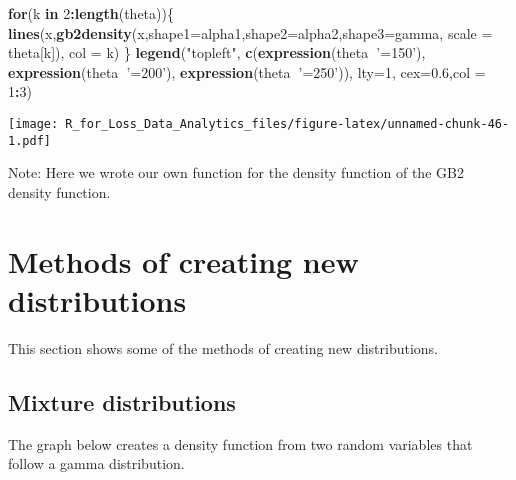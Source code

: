 \documentclass[]{book}
\newenvironment{Shaded}{\begin{snugshade}}{\end{snugshade}}
\newcommand{\KeywordTok}[1]{\textcolor[rgb]{0.13,0.29,0.53}{\textbf{#1}}}
\newcommand{\DataTypeTok}[1]{\textcolor[rgb]{0.13,0.29,0.53}{#1}}
\newcommand{\DecValTok}[1]{\textcolor[rgb]{0.00,0.00,0.81}{#1}}
\newcommand{\FloatTok}[1]{\textcolor[rgb]{0.00,0.00,0.81}{#1}}
\newcommand{\StringTok}[1]{\textcolor[rgb]{0.31,0.60,0.02}{#1}}
\newcommand{\ControlFlowTok}[1]{\textcolor[rgb]{0.13,0.29,0.53}{\textbf{#1}}}
\newcommand{\OperatorTok}[1]{\textcolor[rgb]{0.81,0.36,0.00}{\textbf{#1}}}
\newcommand{\NormalTok}[1]{#1}
\theoremstyle{definition}
\theoremstyle{definition}
\theoremstyle{definition}
\theoremstyle{remark}
\begin{document}
\begin{Shaded}
\begin{Highlighting}[]
\ControlFlowTok{for}\NormalTok{(k }\ControlFlowTok{in} \DecValTok{2}\OperatorTok{:}\KeywordTok{length}\NormalTok{(theta))\{}
  \KeywordTok{lines}\NormalTok{(x,}\KeywordTok{gb2density}\NormalTok{(x,}\DataTypeTok{shape1=}\NormalTok{alpha1,}\DataTypeTok{shape2=}\NormalTok{alpha2,}\DataTypeTok{shape3=}\NormalTok{gamma, }\DataTypeTok{scale =}\NormalTok{ theta[k]), }\DataTypeTok{col =}\NormalTok{ k)}
\NormalTok{\}}
\KeywordTok{legend}\NormalTok{(}\StringTok{"topleft"}\NormalTok{, }\KeywordTok{c}\NormalTok{(}\KeywordTok{expression}\NormalTok{(theta}\OperatorTok{~}\StringTok{'=150'}\NormalTok{), }\KeywordTok{expression}\NormalTok{(theta}\OperatorTok{~}\StringTok{'=200'}\NormalTok{), }\KeywordTok{expression}\NormalTok{(theta}\OperatorTok{~}\StringTok{'=250'}\NormalTok{)), }\DataTypeTok{lty=}\DecValTok{1}\NormalTok{, }\DataTypeTok{cex=}\FloatTok{0.6}\NormalTok{,}\DataTypeTok{col =} \DecValTok{1}\OperatorTok{:}\DecValTok{3}\NormalTok{)}
\end{Highlighting}
\end{Shaded}

\texttt{[image: R\_for\_Loss\_Data\_Analytics\_files/figure-latex/unnamed-chunk-46-1.pdf]}

Note: Here we wrote our own function for the density function of the GB2
density function.

\section{Methods of creating new
distributions}\label{methods-of-creating-new-distributions}

This section shows some of the methods of creating new distributions.

\subsection{Mixture distributions}\label{mixture-distributions}

The graph below creates a density function from two random variables
that follow a gamma distribution.
\end{document}
